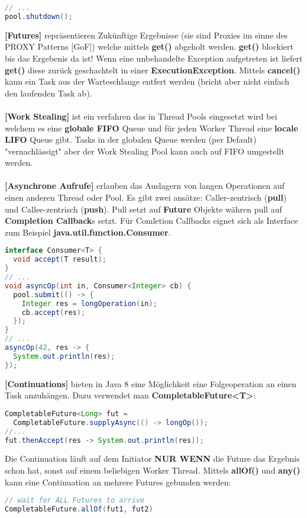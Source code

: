 \documentclass[8pt]{extarticle}
\let\oldtextbf\textbf
\renewcommand{\textbf}{\tiny\oldtextbf}
\begin{document}
\begin{multicols*}{5}
\begin{lstlisting}[language=java]
// ...
pool.shutdown();
\end{lstlisting}
\textbf{[Futures]} repräsentieren Zukünftige Ergebnisse (sie sind Proxies im sinne des PROXY Patterns [GoF]) welche mittels \textbf{get()} abgeholt werden. \textbf{get()} blockiert bis das Ergebenis da ist! Wenn eine unbehandelte Exception aufgetreten ist liefert \textbf{get()} diese zurück geschachtelt in einer \textbf{ExecutionException}. Mittels \textbf{cancel()} kann ein Task aus der Warteschlange entfert werden (bricht aber nicht einfach den laufenden Task ab).\\\\
\textbf{[Work Stealing]} ist ein verfahren das in Thread Pools eingesetzt wird bei welchem es eine \textbf{globale FIFO} Queue und für jeden Worker Thread eine \textbf{locale LIFO} Queue gibt. Tasks in der globalen Queue werden (per Default) "vernachlässigt" aber der Work Stealing Pool kann auch auf FIFO umgestellt werden.\\\\
\textbf{[Asynchrone Aufrufe]} erlauben das Auslagern von langen Operationen auf einen anderen Thread oder Pool. Es gibt zwei ansätze: Caller-zentrisch (\textbf{pull}) und Callee-zentrisch (\textbf{push}). Pull setzt auf \textbf{Future} Objekte währen pull auf \textbf{Completion Callback}s setzt. Für Comletion Callbacks eignet sich als Interface zum Beispiel \textbf{java.util.function.Consumer}.
\begin{lstlisting}[language=java]
interface Consumer<T> {
  void accept(T result);
}
// ...
void asyncOp(int in, Consumer<Integer> cb) {
  pool.submit(() -> {
    Integer res = longOperation(in);
    cb.accept(res);
  });
}
// ...
asyncOp(42, res -> {
  System.out.println(res);
});
\end{lstlisting}
\textbf{[Continuations]} bieten in Java 8 eine Möglichkeit eine Folgeoperation an einen Task anzuhängen. Dazu verwendet man \textbf{CompletableFuture<T>}:
\begin{lstlisting}[language=java]
CompletableFuture<Long> fut = 
  CompletableFuture.supplyAsync(() -> longOp());
//...
fut.thenAccept(res -> System.out.println(res));
\end{lstlisting}
Die Continuation läuft auf dem Initiator \textbf{NUR WENN} die Future das Ergebnis schon hat, sonst auf einem beliebigen Worker Thread. Mittels \textbf{allOf()} und \textbf{any()} kann eine Continuation an mehrere Futures gebunden werden:
\begin{lstlisting}[language=java]
// wait for ALL Futures to arrive
CompletableFuture.allOf(fut1, fut2)

\end{lstlisting}
\end{multicols*}
\end{document}
